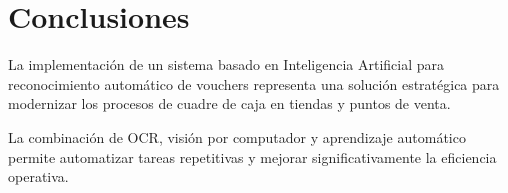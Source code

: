\documentclass[12pt]{article}
\begin{document}
\section{Conclusiones}

La implementación de un sistema basado en Inteligencia Artificial para reconocimiento automático de vouchers representa una solución estratégica para modernizar los procesos de cuadre de caja en tiendas y puntos de venta.

La combinación de OCR, visión por computador y aprendizaje automático permite automatizar tareas repetitivas y mejorar significativamente la eficiencia operativa.
\end{document}
